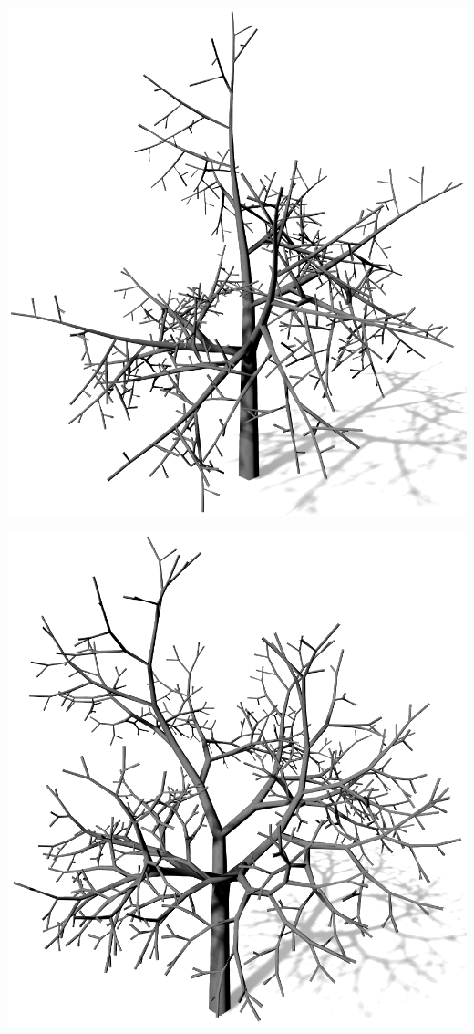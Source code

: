 \newpage
\begin{center}
	\vfill
	\begin{minipage}[c]{0.45\textwidth}
		\centering
		\includegraphics[height=.9\textheight]{images/LS_Sympodial_1}
	\end{minipage}
	\hspace{.05\textwidth}	
	\begin{minipage}[c]{0.45\textwidth}
		\centering
		\includegraphics[height=.9\textheight]{images/LS_Sympodial_2}
	\end{minipage}
	\vspace{0.05\textheight}
	

\end{center}
